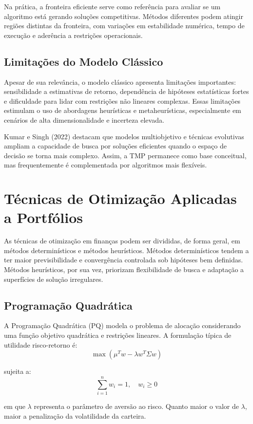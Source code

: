 \documentclass[
  12pt,
  oneside,
  a4paper,
  brazil
]{abntex2}
\begin{document}
Na prática, a fronteira eficiente serve como referência para avaliar se um algoritmo está gerando soluções competitivas. Métodos diferentes podem atingir regiões distintas da fronteira, com variações em estabilidade numérica, tempo de execução e aderência a restrições operacionais.

\subsection{Limitações do Modelo Clássico}
Apesar de sua relevância, o modelo clássico apresenta limitações importantes: sensibilidade a estimativas de retorno, dependência de hipóteses estatísticas fortes e dificuldade para lidar com restrições não lineares complexas. Essas limitações estimulam o uso de abordagens heurísticas e metaheurísticas, especialmente em cenários de alta dimensionalidade e incerteza elevada.

Kumar e Singh (2022) destacam que modelos multiobjetivo e técnicas evolutivas ampliam a capacidade de busca por soluções eficientes quando o espaço de decisão se torna mais complexo. Assim, a TMP permanece como base conceitual, mas frequentemente é complementada por algoritmos mais flexíveis.

\section{Técnicas de Otimização Aplicadas a Portfólios}
As técnicas de otimização em finanças podem ser divididas, de forma geral, em métodos determinísticos e métodos heurísticos. Métodos determinísticos tendem a ter maior previsibilidade e convergência controlada sob hipóteses bem definidas. Métodos heurísticos, por sua vez, priorizam flexibilidade de busca e adaptação a superfícies de solução irregulares.

\subsection{Programação Quadrática}
A Programação Quadrática (PQ) modela o problema de alocação considerando uma função objetivo quadrática e restrições lineares. A formulação típica de utilidade risco-retorno é:
\[
\max \left(\mu^T w - \lambda w^T\Sigma w\right)
\]

sujeita a:
\[
\sum_{i=1}^{n}w_i=1, \quad w_i\geq 0
\]

em que $\lambda$ representa o parâmetro de aversão ao risco. Quanto maior o valor de $\lambda$, maior a penalização da volatilidade da carteira.
\end{document}
